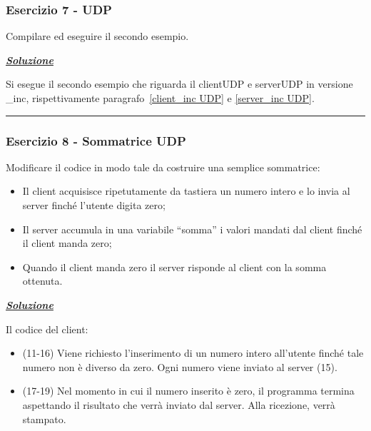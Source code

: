 \documentclass[a4paper]{article}
\newcommand{\longline}{\noindent\rule{\textwidth}{0.4pt}}
\newcommand{\dquotes}[1]{``#1''}
\begin{document}
	\subsubsection{Esercizio 7 - UDP}
	
	Compilare ed eseguire il secondo esempio.\newline
	
	\noindent
	\textcolor{Green4}{\textbf{\emph{\underline{Soluzione}}}}\newline
	
	\noindent
	Si esegue il secondo esempio che riguarda il clientUDP e serverUDP in versione \_inc, rispettivamente paragrafo~\ref{client_inc UDP} e \ref{server_inc UDP}.
	
	\longline
	
	\subsubsection{Esercizio 8 - Sommatrice UDP}\label{esercizio 8 - Sommatrice UDP}
	
	Modificare il codice in modo tale da costruire una semplice sommatrice:
	\begin{itemize}
		\item Il client acquisisce ripetutamente da tastiera un numero intero e lo invia al server finché l'utente digita zero;
		
		\item Il server accumula in una variabile \dquotes{somma} i valori mandati dal client finché il client manda zero;
		
		\item Quando il client manda zero il server risponde al client con la somma ottenuta.
	\end{itemize}

	\noindent
	\textcolor{Green4}{\textbf{\emph{\underline{Soluzione}}}}\newline
	
	\noindent
	Il codice del client:
	
	\begin{itemize}
		\item (11-16) Viene richiesto l'inserimento di un numero intero all'utente finché tale numero non è diverso da zero. Ogni numero viene inviato al server (15).
		
		\item (17-19) Nel momento in cui il numero inserito è zero, il programma termina aspettando il risultato che verrà inviato dal server. Alla ricezione, verrà stampato.
	\end{itemize}\newpage
	
\end{document}

